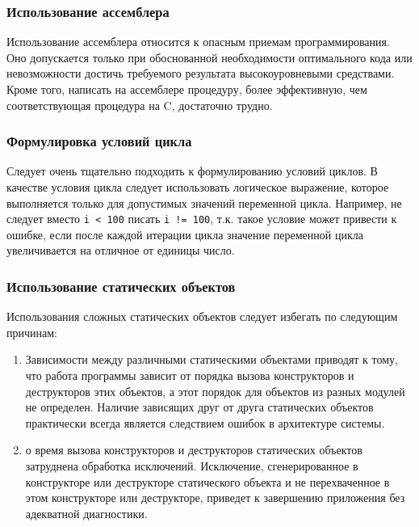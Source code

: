 {{{\subsubsection{Использование ассемблера}

Использование ассемблера относится к опасным приемам программирования. Оно допускается только при обоснованной необходимости оптимального кода или невозможности достичь требуемого результата высокоуровневыми средствами. Кроме того, написать на ассемблере процедуру, более эффективную, чем соответствующая процедура на C, достаточно трудно.

\subsubsection{Формулировка условий цикла}

Следует очень тщательно подходить к формулированию условий циклов. В качестве условия цикла следует использовать логическое выражение, которое выполняется только для допустимых значений переменной цикла. Например, не следует вместо \lstinline|i < 100| писать \lstinline|i != 100|, т.к. такое условие может привести к ошибке, если после каждой итерации цикла значение переменной цикла увеличивается на отличное от единицы число.

\subsubsection{Использование статических объектов}

Использования сложных статических объектов следует избегать по следующим причинам:

\begin{enumerate}
\item Зависимости между различными статическими объектами приводят к тому, что работа программы зависит от порядка вызова конструкторов и деструкторов этих объектов, а этот порядок для объектов из разных модулей не определен. Наличие зависящих друг от друга статических объектов практически всегда является следствием ошибок в архитектуре системы.
\item о время вызова конструкторов и деструкторов статических объектов затруднена обработка исключений. Исключение, сгенерированное в конструкторе или деструкторе статического объекта и не перехваченное в этом конструкторе или деструкторе, приведет к завершению приложения без адекватной диагностики.
\end{enumerate}

}}}
